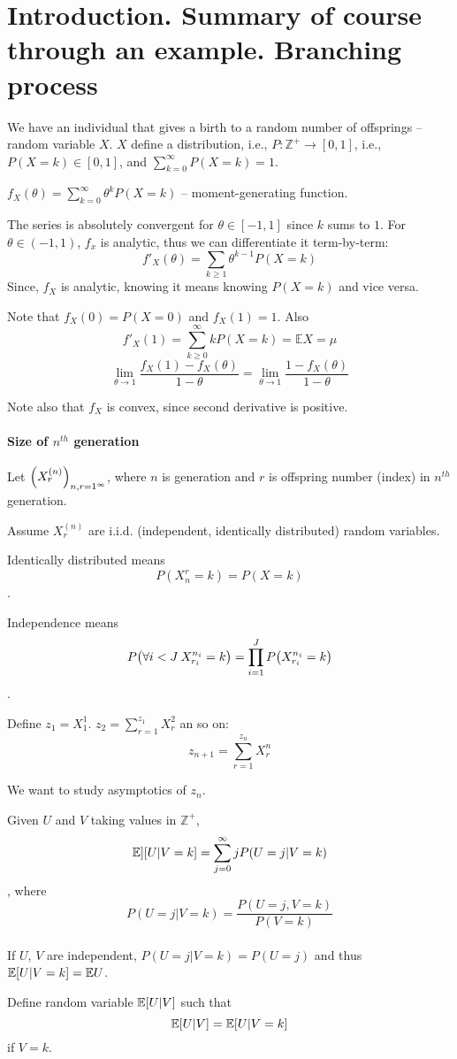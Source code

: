 \section{Introduction. Summary of course through an example. Branching process}
We have an individual that gives a birth to a random number of offsprings -- random variable $X$.
$X$ define a distribution, i.e., $P: \mathbb{Z}^+ \to [0,1]$, i.e., $P(X=k) \in [0,1]$, and $\sum_{k=0}^\infty P(X=k)  = 1$.

\begin{definition}
	$f_X(\theta) = \sum_{k=0}^\infty \theta^k P(X=k)$ -- moment-generating function.
\end{definition}

 The series is absolutely convergent for $\theta\in [-1,1]$ since $k$ sums to $1$. For $\theta \in (-1,1)$, $f_x$ is analytic, thus we can differentiate it term-by-term:
$$f'_X(\theta) = \sum_{k\geq1} \theta^{k-1} P(X=k)$$
Since, $f_X$ is analytic, knowing it means knowing $P(X=k)$ and vice versa.

Note that $f_X(0) = P(X=0)$ and $f_X(1)=1$. Also
$$f'_X(1) = \sum_{k\geq 0 }^\infty k P(X=k) = \mathbb{E} X = \mu$$
$$\lim_{\theta \to 1} \frac{f_X(1)-f_X(\theta)}{1-\theta}=\lim_{\theta \to 1} \frac{1-f_X(\theta)}{1-\theta}$$

Note also that $f_X$ is convex, since second derivative is positive.
\paragraph{Size of $n^{th}$ generation}
Let $\qty(X_r^{(n)})_{n,r=1^\infty}$, where $n$ is generation and $r$ is offspring number (index) in $n^{th}$ generation.

Assume $X_r^{(n)}$ are i.i.d.  (independent, identically distributed) random variables.

Identically distributed means $$P(X_n^r = k) = P(X=k)$$.

Independence means $$P\qty(\forall i<J \: X_{r_i}^{n_i} =k) = \prod_{i=1}^J P\qty( X_{r_i}^{n_i} =k)$$.

Define $z_1=X_1^1$. $z_2 = \sum_{r=1}^{z_1} X_r^2$ an so on:
$$z_{n+1} = \sum_{r=1}^{z_n} X_{r}^{n}$$

We want to study asymptotics of $z_n$.

Given $U$ and $V$ taking values in $ \mathbb{Z}^+$,
$$\mathbb{E}] \qty[ U|V=k] = \sum_{j=0}^\infty j P(U=j | V=k)$$, where $$P(U=j|V=k) = \frac{P(U=j, V=k)}{P(V=k)}$$

\paragraph{} If $U$, $V$ are independent, $P(U=j|V=k) = P(U=j)$ and thus $\mathbb{E}\qty[ U|V=k] = \mathbb{E} U$.
\begin{definition}
Define random variable $\mathbb{E}\qty[U|V]$ such that
$$\mathbb{E}\qty[U|V] = \mathbb{E}\qty[U|V=k] $$
if $V=k$.
\end{definition}


